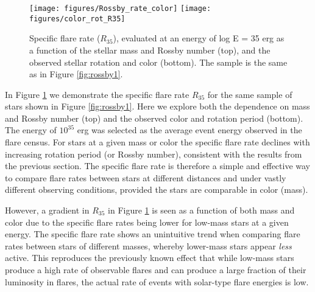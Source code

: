 \documentclass[preprint2]{aastex62}
\begin{document}

\begin{figure}[!t]
\centering
\texttt{[image: figures/Rossby\_rate\_color]}
\texttt{[image: figures/color\_rot\_R35]}
\caption{
Specific flare rate ($R_{35}$), evaluated at an energy of log E = 35 erg as a function of the stellar mass and Rossby number (top), and the observed stellar rotation and color (bottom). The sample is the same as in Figure \ref{fig:rossby1}.
}
\label{fig:rossby2}
\end{figure}


In Figure \ref{fig:rossby2} we demonstrate the specific flare rate $R_{35}$ for the same sample of stars shown in Figure \ref{fig:rossby1}. Here we explore both the dependence on mass and Rossby number (top) and the observed color and rotation period (bottom). The energy of $10^{35}$ erg was selected as the average event energy observed in the \citet{davenport2016} flare census. For stars at a given mass or color the specific flare rate declines with increasing rotation period (or Rossby number), consistent with the results from the previous section. The specific flare rate is therefore a simple and effective way to compare flare rates between stars at different distances and under vastly different observing conditions, provided the stars are comparable in color (mass).


However, a gradient in $R_{35}$ in Figure \ref{fig:rossby2} is seen as a function of both mass and color due to the specific flare rates being lower for low-mass stars at a given energy. The specific flare rate shows an unintuitive trend when comparing flare rates between stars of different masses, whereby lower-mass stars appear {\it less} active.
This reproduces the previously known effect that while low-mass stars produce a high rate of observable flares and can produce a large fraction of their luminosity in flares, the actual rate of events with solar-type flare energies is low. 
\end{document}
